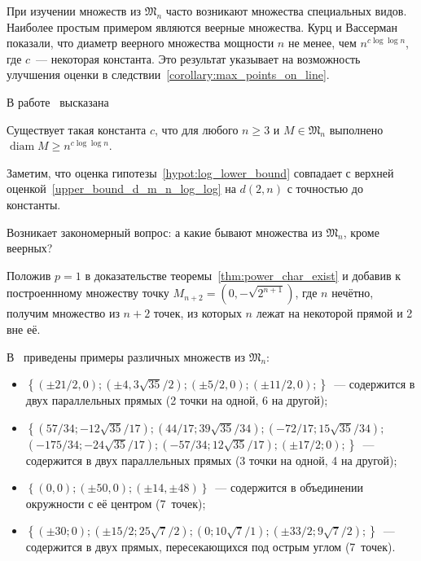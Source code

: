 При изучении множеств из $\mathfrak{M}_n$ часто возникают множества специальных видов.
Наиболее простым примером являются веерные множества.
Курц и Вассерман~\cite{kurz2008minimum} показали, что диаметр веерного множества мощности $n$
не менее, чем $n^{c \log \log n}$, где $c$~--- некоторая константа.
Это результат указывает на возможность улучшения оценки в следствии~\ref{corollary:max_points_on_line}.

В работе~\cite{kurz2008minimum} высказана
\begin{hypothesis}
	\label{hypot:log_lower_bound}
	Существует такая константа $c$,
	что для любого $n\geq 3$ и $M\in\mathfrak{M}_n$ выполнено
	$\operatorname{diam} M \geq n^{c \log \log n}$.
\end{hypothesis}

Заметим, что оценка гипотезы~\ref{hypot:log_lower_bound}
совпадает с верхней оценкой~\eqref{upper_bound_d_m_n_log_log} на $d(2,n)$
с точностью до константы.


Возникает закономерный вопрос: а какие бывают множества из $\mathfrak{M}_n$,
кроме веерных?

Положив $p=1$ в доказательстве теоремы~\ref{thm:power_char_exist} и добавив к построеннному множеству
точку $M_{n+2} = (0, -\sqrt{2^{n+1}})$, где $n$ нечётно,
получим множество из $n+2$ точек, из которых $n$ лежат на некоторой прямой и 2 вне её.

В~\cite{our-vvmsh-2018} приведены примеры различных множеств из $\mathfrak{M}_n$:
\begin{itemize}
	\item
		$
		\left\{
		(\pm 21/2, 0);
		(\pm 4, 3\sqrt{35}/2);
		(\pm 5/2, 0);
		(\pm 11/2, 0);
		\right\}
		$~---
		содержится в двух параллельных прямых (2 точки на одной, 6 на другой);



	\item
		$
		\left\{
		\left( {57/34} ; -{12\sqrt{35}/17}\right);
		\left( {44/17} ; {39\sqrt{35}/34}\right);
		\left( -{72/17} ;
		{15\sqrt{35}/34}\right);
		\right.$ \\ $\left.
		\left( -{175/34} ; -{24\sqrt{35}/17}\right);
		\left( -{57/34} ; {12\sqrt{35}/17}\right);
		\left( \pm{17/2} ; 0\right);
		\right\}
		$~---
		содержится в двух параллельных прямых (3 точки на одной, 4 на другой);

	\item
		$
		\left\{
		(0,0);(\pm 50, 0); (\pm 14, \pm 48)
		\right\}
		$~---
		содержится в объединении окружности с её центром (7~точек);

	\item
		$
		\left\{
		\left( \pm30 ; 0\right);
		\left( \pm{15/2} ; {25\sqrt{7}/2}\right);
		\left( 0 ; {10\sqrt{7}/1}\right);
		\left( \pm{33/2} ; {9\sqrt{7}/2}\right);
		\right\}
		$~---
		содержится в двух прямых, пересекающихся под острым углом (7~точек).
\end{itemize}

